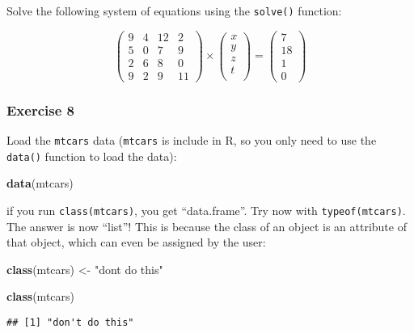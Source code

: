\documentclass[
]{article}
\newenvironment{Shaded}{\begin{snugshade}}{\end{snugshade}}
\newcommand{\KeywordTok}[1]{\textcolor[rgb]{0.13,0.29,0.53}{\textbf{#1}}}
\newcommand{\NormalTok}[1]{#1}
\newcommand{\StringTok}[1]{\textcolor[rgb]{0.31,0.60,0.02}{#1}}
\begin{document}
Solve the following system of equations using the \texttt{solve()} function:

\[
\left(
\begin{array}{cccc}
 9 & 4 & 12 & 2 \\
 5 & 0 & 7 & 9\\
 2 & 6 & 8 & 0\\
 9 & 2 & 9 & 11
\end{array} \right) \times \left(
\begin{array}{ccc}
 x \\
 y \\
 z \\
 t \\
\end{array}\right) =
\left(
\begin{array}{ccc}
7\\
18\\
1\\
0
\end{array}
\right)
\]

\hypertarget{exercise-8}{%
\subsubsection*{Exercise 8}\label{exercise-8}}

Load the \texttt{mtcars} data (\texttt{mtcars} is include in R, so you only need to use the \texttt{data()} function to
load the data):

\begin{Shaded}
\begin{Highlighting}[]
\KeywordTok{data}\NormalTok{(mtcars)}
\end{Highlighting}
\end{Shaded}

if you run \texttt{class(mtcars)}, you get ``data.frame''. Try now with \texttt{typeof(mtcars)}. The answer is now
``list''! This is because the class of an object is an attribute of that object, which can even
be assigned by the user:

\begin{Shaded}
\begin{Highlighting}[]
\KeywordTok{class}\NormalTok{(mtcars) \textless{}{-}}\StringTok{ "don\textquotesingle{}t do this"}

\KeywordTok{class}\NormalTok{(mtcars)}
\end{Highlighting}
\end{Shaded}

\begin{verbatim}
## [1] "don't do this"
\end{verbatim}
\end{document}
